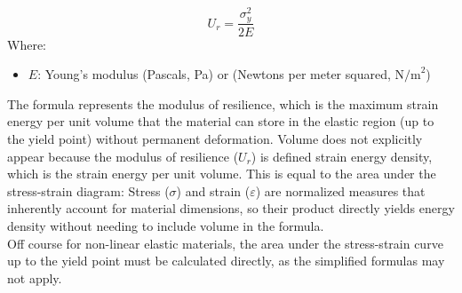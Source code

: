 \documentclass{article}
\begin{document}
{\begin{equation}
    U_r = \frac{\sigma_y^2}{2E}
\end{equation}
Where:
\begin{itemize}[itemsep=-1mm]
    \item \( E \): {Young's modulus} (Pascals, Pa) or (Newtons per meter squared, \( \text{N/m}^2 \))
\end{itemize}
The formula represents the modulus of resilience, which is the maximum strain energy per unit volume that the material can store in the elastic region (up to the yield point) without permanent deformation. Volume does not explicitly appear because the modulus of resilience (\(U_r\)) is defined strain energy density, which is the strain energy per unit volume. This is equal to the area under the stress-strain diagram:  Stress (\(\sigma\)) and strain (\(\varepsilon\)) are normalized measures that inherently account for material dimensions, so their product directly yields energy density without needing to include volume in the formula.\\[8pt]
Off course for non-linear elastic materials, the area under the stress-strain curve up to the yield point must be calculated directly, as the simplified formulas may not apply.
\newpage    

}
\end{document}
